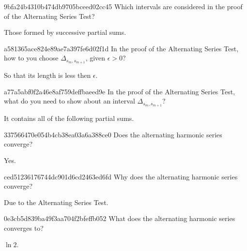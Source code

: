\begin{note}{9bfa24b4310b474db9705bceed02cc45}
    Which intervals are considered in the proof of the Alternating Series Test?

    \begin{cloze}{1}
        Those formed by successive partial sums.
    \end{cloze}
\end{note}

\begin{note}{a581365ace824e89ae7a397fe6d02f1d}
    In the proof of the Alternating Series Test, how to you choose \({ \Delta_{s_m, s_{m+1}} }\), given \({ \epsilon > 0 }\)?

    \begin{cloze}{1}
        So that its length is less then \({ \epsilon }\).
    \end{cloze}
\end{note}

\begin{note}{a77a5abf0f2a46e8af759deffbaeed9e}
    In the proof of the Alternating Series Test, what do you need to show about an interval \({ \Delta_{s_m, s_{m+1}} }\)?

    \begin{cloze}{1}
        It contains all of the following partial sums.
    \end{cloze}
\end{note}

\begin{note}{337566470e054b4cb38ea03a6a388ce0}
    Does the alternating harmonic series converge?

    \begin{cloze}{1}
        Yes.
    \end{cloze}
\end{note}

\begin{note}{ced51236176744dc901d6cd2463ed6fd}
    Why does the alternating harmonic series converge?

    \begin{cloze}{1}
        Due to the Alternating Series Test.
    \end{cloze}
\end{note}

\begin{note}{0e3cb5d839ba49f3aa704f2bfeffb052}
    What does the alternating harmonic series converges to?

    \begin{cloze}{1}
        \({ \ln 2 }\).
    \end{cloze}
\end{note}

